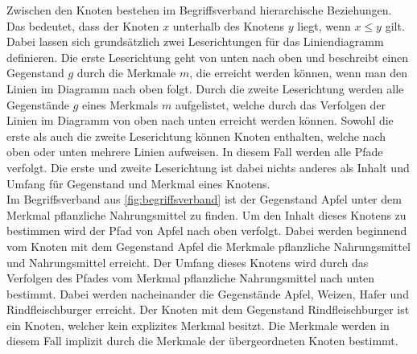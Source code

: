 Zwischen den Knoten bestehen im Begriffsverband hierarchische Beziehungen.
Das bedeutet, dass der Knoten $x$ unterhalb des Knotens $y$ liegt, wenn $x \leq y$ gilt.
Dabei lassen sich grundsätzlich zwei Leserichtungen für das Liniendiagramm definieren.
Die erste Leserichtung geht von unten nach oben und beschreibt einen Gegenstand $g$ durch die Merkmale $m$, die erreicht werden können, wenn man den Linien im Diagramm nach oben folgt.
Durch die zweite Leserichtung werden alle Gegenstände $g$ eines Merkmals $m$ aufgelistet, welche durch das Verfolgen der Linien im Diagramm von oben nach unten erreicht werden können.
Sowohl die erste als auch die zweite Leserichtung können Knoten enthalten, welche nach oben oder unten mehrere Linien aufweisen.
In diesem Fall werden alle Pfade verfolgt.
Die erste und zweite Leserichtung ist dabei nichts anderes als Inhalt und Umfang für Gegenstand und Merkmal eines Knotens. \\

Im Begriffsverband aus \autoref{fig:begriffsverband} ist der Gegenstand Apfel unter dem Merkmal pflanzliche Nahrungsmittel zu finden.
Um den Inhalt dieses Knotens zu bestimmen wird der Pfad von Apfel nach oben verfolgt.
Dabei werden beginnend vom Knoten mit dem Gegenstand Apfel die Merkmale pflanzliche Nahrungsmittel und Nahrungsmittel erreicht.
Der Umfang dieses Knotens wird durch das Verfolgen des Pfades vom Merkmal pflanzliche Nahrungsmittel nach unten bestimmt.
Dabei werden nacheinander die Gegenstände Apfel, Weizen, Hafer und Rindfleischburger erreicht.
Der Knoten mit dem Gegenstand Rindfleischburger ist ein Knoten, welcher kein explizites Merkmal besitzt.
Die Merkmale werden in diesem Fall implizit durch die Merkmale der übergeordneten Knoten bestimmt. \\
